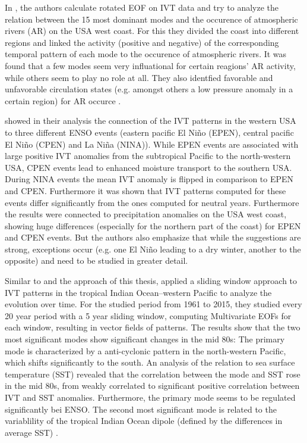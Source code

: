 In \cite{guirguis_circulation_2018}, the authors calculate rotated EOF on IVT data and try to analyze the relation between the 15 most dominant modes and the occurence of atmospheric rivers (AR) on the USA west coast. 
For this they divided the coast into different regions and linked the activity (positive and negative) of the corresponding temporal pattern of each mode to the occurence of atmospheric rivers. 
It was found that a few modes seem very influational for certain reagions' AR activity, while others seem to play no role at all. 
They also identfied favorable and unfavorable circulation states (e.g. amongst others a low pressure anomaly in a certain region) for AR occurce \cite{guirguis_circulation_2018}. 


\citeauthor{kim_ensos_2015} showed in their analysis the connection of the IVT patterns in the western USA to three different ENSO events (eastern pacific El Niño (EPEN), central pacific El Niño (CPEN) and La Niña (NINA)). 
While EPEN events are associated with large positive IVT anomalies from the subtropical Pacific to the north-western USA, CPEN events lead to enhanced moisture transport to the southern USA. 
During NINA events the mean IVT anomaly is flipped in comparison to EPEN and CPEN. 
Furthermore it was shown that IVT patterns computed for these events differ significantly from the ones computed for neutral years.
Furthermore the results were connected to precipitation anomalies on the USA west coast, showing huge differences (especially for the northern part of the coast) for EPEN and CPEN events. 
But the authors also emphasize that while the suggestions are strong, exceptions occur (e.g. one El Niño leading to a dry winter, another to the opposite) and need to be studied in greater detail.

Similar to \cite{vietinghoff_visual_2021} and the approach of this thesis, \citeauthor{zou_interdecadal_2018} applied a sliding window approach to IVT patterns in the tropical Indian Ocean–western Pacific to analyze the evolution over time. 
For the studied period from 1961 to 2015, they studied every 20 year period with a 5 year sliding window, computing Multivariate EOFs for each window, resulting in vector fields of patterns. 
The results show that the two most significant modes show significant changes in the mid 80s: The primary mode is characterized by a anti-cyclonic pattern in the north-western Pacific, which shifts significantly to the south. 
An analysis of the relation to sea surface temperature (SST) revealed that the correlation between the mode and SST rose in the mid 80s, from weakly correlated to significant positive correlation between IVT and SST anomalies. 
Furthermore, the primary mode seems to be regulated significantly bei ENSO. 
The second most significant mode is related to the variablility of the tropical Indian Ocean dipole (defined by the differences in average SST) \cite{zou_interdecadal_2018}.

